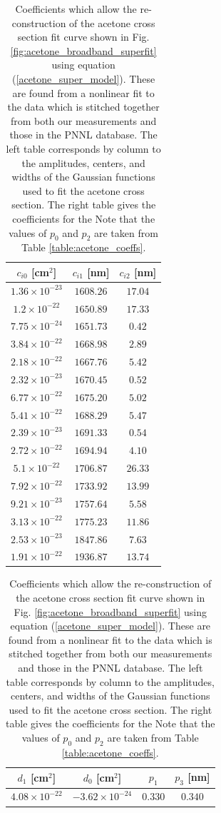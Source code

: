 \documentclass[8pt,a4paper]{report}
\begin{document}
	\begin{table}[H]
		\caption{Coefficients which allow the re-construction of the acetone cross section fit curve shown in Fig. \ref{fig:acetone_broadband_superfit} using equation (\ref{acetone_super_model}). These are found from a nonlinear fit to the data which is stitched together from both our measurements and those in the PNNL database. The left table corresponds by column to the amplitudes, centers, and widths of the Gaussian functions used to fit the acetone cross section. The right table gives the coefficients for the  Note that the values of $p_0$ and $p_2$ are taken from Table \ref{table:acetone_coeffs}.}
		\begin{center}
			\begin{tabular}{|c|c|c|}
				\hline
				$c_{i0}$ [cm$^2$] & $c_{i1}$ [nm] & $c_{i2}$ [nm] \\
				\hline
				$1.36 \times 10^{-23}$ & $1608.26$ & $17.04$ \\
				\hline
				$1.2 \times 10^{-22}$ & $1650.89$ & $17.33$ \\
				\hline
				$7.75 \times 10^{-24}$ & $1651.73$ & $0.42$ \\
				\hline
				$3.84 \times 10^{-22}$ & $1668.98$ & $2.89$ \\
				\hline
				$2.18 \times 10^{-22}$ & $1667.76$ & $5.42$ \\
				\hline
				$2.32 \times 10^{-23}$ & $1670.45$ & $0.52$ \\
				\hline
				$6.77 \times 10^{-22}$ & $1675.20$ & $5.02$ \\
				\hline
				$5.41 \times 10^{-22}$ & $1688.29$ & $5.47$ \\
				\hline
				$2.39 \times 10^{-23}$ & $1691.33$ & $0.54$ \\
				\hline
				$2.72 \times 10^{-22}$ & $1694.94$ & $4.10$ \\
				\hline
				$5.1 \times 10^{-22}$ & $1706.87$ & $26.33$ \\
				\hline
				$7.92 \times 10^{-22}$ & $1733.92$ & $13.99$ \\
				\hline
				$9.21 \times 10^{-23}$ & $1757.64$ & $5.58$ \\
				\hline
				$3.13 \times 10^{-22}$ & $1775.23$ & $11.86$ \\
				\hline
				$2.53 \times 10^{-23}$ & $1847.86$ & $7.63$ \\
				\hline
				$1.91 \times 10^{-22}$ & $1936.87$ & $13.74$ \\
				\hline
			\end{tabular}
			\begin{tabular}{|c|c|c|c|}
				\hline
				$d_{1}$ [cm$^2$] & $d_{0}$ [cm$^2$] & $p_1$ & $p_3$ [nm] \\
				\hline
				$4.08 \times 10^{-22}$ & $-3.62 \times 10^{-24}$ & $0.330$ & $0.340$ \\
				\hline
			\end{tabular}
		\end{center}
		\label{tbl:acetone_broadband_coeffs}
	\end{table}
	
\end{document}
